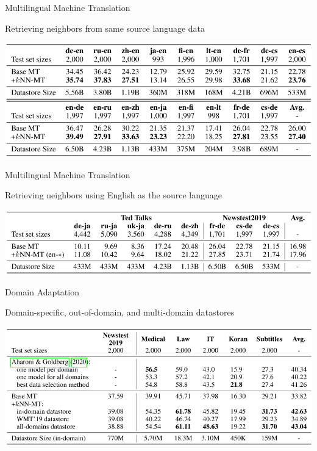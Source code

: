 \documentclass[unicode, 12pt, xdvipdfmx, aspectratio=169]{beamer}
\begin{document}
\begin{frame}[label={sec:org32172a4}]{Multilingual Machine Translation}
\begin{block}{Retrieving neighbors from same source language data}
\begin{center}
\includegraphics[width=\linewidth]{./figure/Table1.pdf}
\end{center}
\end{block}
\end{frame}

\begin{frame}[label={sec:orgd3555a9}]{Multilingual Machine Translation}
\begin{block}{Retrieving neighbors using English as the source language}
\begin{center}
\includegraphics[width=\linewidth]{./figure/Table2.pdf}
\end{center}
\end{block}
\end{frame}

\begin{frame}[label={sec:orgfa60f73}]{Domain Adaptation}
\begin{block}{Domain-specific, out-of-domain, and multi-domain datastores}
\begin{center}
\includegraphics[width=\linewidth]{./figure/Table3.pdf}
\end{center}
\end{block}
\end{frame}
\end{document}
